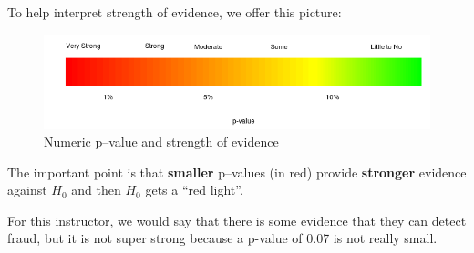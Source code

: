  To help interpret strength of evidence, we offer this picture:
 \begin{figure}[h]
   \centering
\includegraphics[width=\linewidth]{../plots/pvalueStrengths.png}
   \caption{Numeric p--value and strength of evidence}
   \label{fig:SOE-pvalue}
 \end{figure}

  The important point is that {\bf smaller} p--values (in red) provide {\bf
    stronger} evidence against $H_0$ and then $H_0$ gets a ``red light''. 

  For this instructor, we would say that there is some evidence that
  they can detect fraud, but it is not super strong because a p-value
  of 0.07 is not really small.


